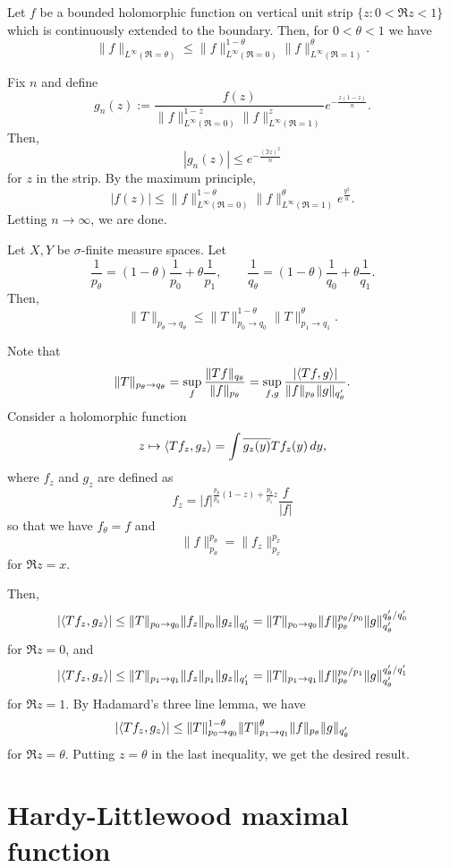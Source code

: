\documentclass{../../large}
\begin{document}
\begin{prb}
Let $f$ be a bounded holomorphic function on vertical unit strip $\{z:0<\Re z<1\}$ which is continuously extended to the boundary.
Then, for $0<\theta<1$ we have
\[\|f\|_{L^\infty(\Re=\theta)}\le\|f\|_{L^\infty(\Re=0)}^{1-\theta}\|f\|_{L^\infty(\Re=1)}^\theta.\]
\end{prb}
\begin{pf}
Fix $n$ and define
\[g_n(z):=\frac{f(z)}{\|f\|_{L^\infty(\Re=0)}^{1-z}\|f\|_{L^\infty(\Re=1)}^z}e^{-\frac{z(1-z)}n}.\]
Then,
\[|g_n(z)|\le e^{-\frac{(\Im z)^2}n}\]
for $z$ in the strip.
By the maximum principle,
\[|f(z)|\le\|f\|_{L^\infty(\Re=0)}^{1-\theta}\|f\|_{L^\infty(\Re=1)}^\theta e^{\frac{y^2}n}.\]
Letting $n\to\infty$, we are done.
\end{pf}



\begin{prb}
Let $X,Y$ be $\sigma$-finite measure spaces.
Let
\[\frac1{p_\theta}=(1-\theta)\frac1{p_0}+\theta\frac1{p_1},\qquad\frac1{q_\theta}=(1-\theta)\frac1{q_0}+\theta\frac1{q_1}.\]
Then,
\[\|T\|_{p_\theta\to q_\theta}\le\|T\|_{p_0\to q_0}^{1-\theta}\|T\|_{p_1\to q_1}^\theta.\]
\end{prb}
\begin{pf}
Note that
\[\|T\|_{p_\theta\to q_\theta}=\sup_f\frac{\|Tf\|_{q_\theta}}{\|f\|_{p_\theta}}=\sup_{f,g}\frac{|\langle Tf,g\rangle|}{\|f\|_{p_\theta}\|g\|_{q'_\theta}}.\]
Consider a holomorphic function
\[z\mapsto\langle Tf_z,g_z\rangle=\int\overline{g_z(y)}Tf_z(y)\,dy,\]
where $f_z$ and $g_z$ are defined as
\[f_z=|f|^{\frac{p_\theta}{p_0}(1-z)+\frac{p_\theta}{p_1}z}\frac f{|f|}\]
so that we have $f_\theta=f$ and
\[\|f\|_{p_\theta}^{p_\theta}=\|f_z\|_{p_x}^{p_x}\]
for $\Re z=x$.

Then,
\[|\langle Tf_z,g_z\rangle|\le\|T\|_{p_0\to q_0}\|f_z\|_{p_0}\|g_z\|_{q'_0}=\|T\|_{p_0\to q_0}\|f\|_{p_\theta}^{p_\theta/p_0}\|g\|_{q'_\theta}^{q'_\theta/q'_0}\]
for $\Re z=0$, and
\[|\langle Tf_z,g_z\rangle|\le\|T\|_{p_1\to q_1}\|f_z\|_{p_1}\|g_z\|_{q'_1}=\|T\|_{p_1\to q_1}\|f\|_{p_\theta}^{p_\theta/p_1}\|g\|_{q'_\theta}^{q'_\theta/q'_1}\]
for $\Re z=1$.
By Hadamard's three line lemma, we have
\[|\langle Tf_z,g_z\rangle|\le\|T\|_{p_0\to q_0}^{1-\theta}\|T\|_{p_1\to q_1}^\theta\|f\|_{p_\theta}\|g\|_{q'_\theta}\]
for $\Re z=\theta$.
Putting $z=\theta$ in the last inequality, we get the desired result.
\end{pf}




\section{Hardy-Littlewood maximal function}
\end{document}
